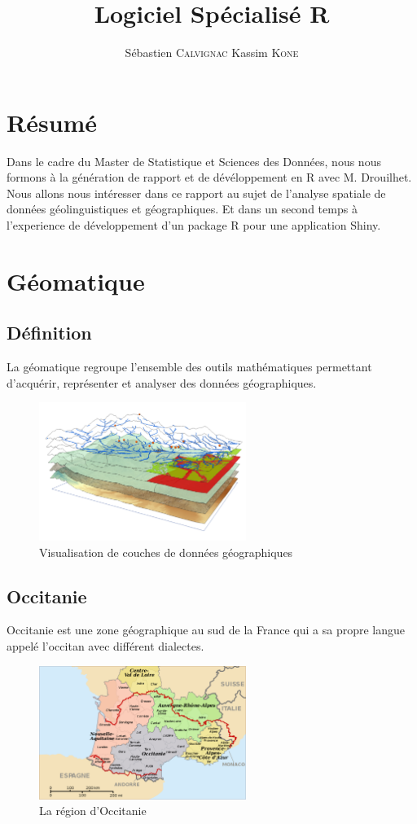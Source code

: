 \documentclass[a4paper, twoside]{article}
\title{Logiciel Spécialisé R}
\author{Sébastien \textsc{Calvignac} \linebreak Kassim \textsc{Kone}}
\begin{document}



\tableofcontents
\clearpage
\section{Résumé}
Dans le cadre du Master de Statistique et Sciences des Données, nous nous 
formons à la génération de rapport et de dévéloppement en R avec M. Drouilhet. 
Nous allons nous intéresser dans ce rapport au sujet de l'analyse spatiale de 
données géolinguistiques et géographiques. Et dans un second temps à 
l'experience de développement d'un package R pour une application Shiny.

\section{Géomatique}
\subsection{Définition}
La géomatique regroupe l'ensemble des outils mathématiques permettant 
d'acquérir,  représenter et analyser des données géographiques.

\begin{figure}[h]
\caption{Visualisation de couches de données géographiques}
\centering
\includegraphics[width=0.6\textwidth]{couchesGeo}
\end{figure}

\subsection{Occitanie}
Occitanie est une zone géographique au sud de la France qui a sa propre langue 
appelé l'occitan avec différent dialectes. 

\begin{figure}[h]
\caption{La région d’Occitanie}
\centering
\includegraphics[width=0.6\textwidth]{occitan}
\end{figure}
\end{document}
